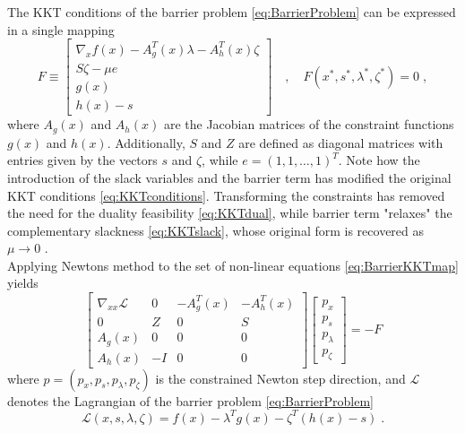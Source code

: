 The KKT conditions of the barrier problem \eqref{eq:BarrierProblem} can be expressed in a single mapping 
\begin{equation}
	F \equiv 
	\begin{bmatrix}
  \nabla_x f(x) - A_{g}^{T}(x) \lambda  - A_{h}^{T}(x) \zeta \\
  S \zeta - \mu e \\
  g(x)		\\
  h(x) - s 
  \end{bmatrix}
  \quad , \quad F(x^*,s^*,\lambda^*,\zeta^*) = 0 \; ,
  \label{eq:BarrierKKTmap}
\end{equation}
where $A_g (x)$ and $A_h (x)$ are the Jacobian matrices of the constraint functions $g(x)$ and $h(x)$. Additionally, $S$ and $Z$ are defined as diagonal matrices with entries given by the vectors $s$ and $\zeta$, while $e = (1 ,1 , \ldots , 1 )^T$. Note how the introduction of the slack variables and the barrier term has modified the original KKT conditions \eqref{eq:KKTconditions}. Transforming the constraints has removed the need for the duality feasibility \eqref{eq:KKTdual}, while barrier term "relaxes" the complementary slackness \eqref{eq:KKTslack}, whose original form is recovered as $\mu \to 0$ \cite{wright}.\\
Applying Newtons method to the set of non-linear equations \eqref{eq:BarrierKKTmap} yields
\begin{equation}
  \begin{bmatrix}
  \nabla_{xx} \mathcal{L} 	& 0 	& -A_{g}^{T}(x)	& -A_{h}^{T}(x)	\\
  0 						& Z 	& 0 			& S 			\\
  A_{g}(x) 					& 0 	& 0 			& 0				\\
  A_{h}(x) 					& -I	& 0				& 0				 
  \end{bmatrix}  
  \begin{bmatrix}
  p_x \\ p_s \\ p_{\lambda} \\ p_{\zeta} 
  \end{bmatrix}
  = - F
  \label{eq:ConNewtonMethod}
\end{equation}
where $p = ( p_x , p_s , p_{\lambda} , p_{\zeta} )$ is the constrained Newton step direction, and $\mathcal{L}$ denotes the Lagrangian of the barrier problem \eqref{eq:BarrierProblem}
\begin{equation}
	\mathcal{L}(x,s,\lambda,\zeta) = f(x) - \lambda^T g(x) - \zeta^T ( h(x) - s)  \; .
\end{equation}
